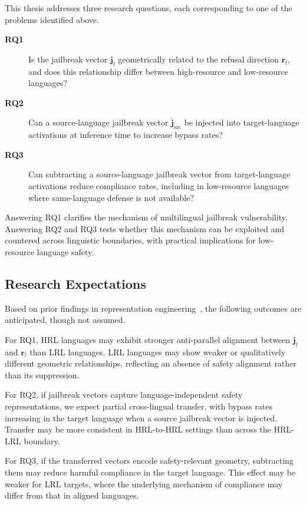 This thesis addresses three research questions, each corresponding to one of the problems identified above.

\begin{description}
    \item[\textbf{RQ1}] Is the jailbreak vector $\mathbf{j}_l$ geometrically related to the refusal direction $\mathbf{r}_l$, and does this relationship differ between high-resource and low-resource languages?

    \item[\textbf{RQ2}] Can a source-language jailbreak vector $\hat{\mathbf{j}}_\mathrm{src}$ be injected into target-language activations at inference time to increase bypass rates?

    \item[\textbf{RQ3}] Can subtracting a source-language jailbreak vector from target-language activations reduce compliance rates, including in low-resource languages where same-language defense is not available?
\end{description}

Answering RQ1 clarifies the mechanism of multilingual jailbreak vulnerability. Answering RQ2 and RQ3 tests whether this mechanism can be exploited and countered across linguistic boundaries, with practical implications for low-resource language safety.

\subsection*{Research Expectations}

Based on prior findings in representation engineering~\citep{arditi2024refusal, wang2026refusal}, the following outcomes are anticipated, though not assumed.

For RQ1, HRL languages may exhibit stronger anti-parallel alignment between $\mathbf{j}_l$ and $\mathbf{r}_l$ than LRL languages. LRL languages may show weaker or qualitatively different geometric relationships, reflecting an absence of safety alignment rather than its suppression.

For RQ2, if jailbreak vectors capture language-independent safety representations, we expect partial cross-lingual transfer, with bypass rates increasing in the target language when a source jailbreak vector is injected. Transfer may be more consistent in HRL-to-HRL settings than across the HRL-LRL boundary.

For RQ3, if the transferred vectors encode safety-relevant geometry, subtracting them may reduce harmful compliance in the target language. This effect may be weaker for LRL targets, where the underlying mechanism of compliance may differ from that in aligned languages.

